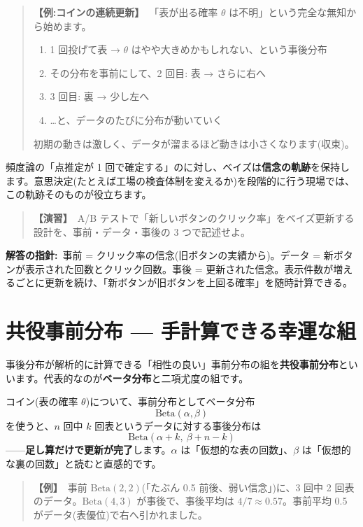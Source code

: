 \documentclass{article}
\begin{document}
\begin{quote}
\textbf{【例:コインの連続更新】}\ 「表が出る確率 \(\theta\) は不明」という完全な無知から始めます。
\begin{enumerate}
\item 1 回投げて表 → \(\theta\) はやや大きめかもしれない、という事後分布
\item その分布を事前にして、2 回目: 表 → さらに右へ
\item 3 回目: 裏 → 少し左へ
\item …と、データのたびに分布が動いていく
\end{enumerate}
初期の動きは激しく、データが溜まるほど動きは小さくなります(収束)。
\end{quote}

頻度論の「点推定が 1 回で確定する」のに対し、ベイズは\textbf{信念の軌跡}を保持します。意思決定(たとえば工場の検査体制を変えるか)を段階的に行う現場では、この軌跡そのものが役立ちます。

\begin{quote}
\textbf{【演習】}\ A/B テストで「新しいボタンのクリック率」をベイズ更新する設計を、事前・データ・事後の 3 つで記述せよ。
\end{quote}

\textbf{解答の指針:}\ 事前 = クリック率の信念(旧ボタンの実績から)。データ = 新ボタンが表示された回数とクリック回数。事後 = 更新された信念。表示件数が増えるごとに更新を続け、「新ボタンが旧ボタンを上回る確率」を随時計算できる。

\section{共役事前分布 — 手計算できる幸運な組}

事後分布が解析的に計算できる「相性の良い」事前分布の組を\textbf{共役事前分布}といいます。代表的なのが\textbf{ベータ分布}と二項尤度の組です。

コイン(表の確率 \(\theta\))について、事前分布としてベータ分布
\[ \mathrm{Beta}(\alpha, \beta) \]
を使うと、\(n\) 回中 \(k\) 回表というデータに対する事後分布は
\[ \mathrm{Beta}(\alpha + k,\ \beta + n - k) \]
——\textbf{足し算だけで更新が完了}します。\(\alpha\) は「仮想的な表の回数」、\(\beta\) は「仮想的な裏の回数」と読むと直感的です。

\begin{quote}
\textbf{【例】}\ 事前 \(\mathrm{Beta}(2, 2)\)(「たぶん 0.5 前後、弱い信念」)に、3 回中 2 回表のデータ。\(\mathrm{Beta}(4, 3)\) が事後で、事後平均は \(4/7 \approx 0.57\)。事前平均 0.5 がデータ(表優位)で右へ引かれました。
\end{quote}
\end{document}
